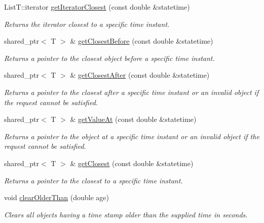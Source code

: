 \begin{DoxyCompactItemize}
List\-T\-::iterator \hyperlink{classmsf__core_1_1SortedContainer_a64ce9fdfdd6220f78187e7270f689f02}{get\-Iterator\-Closest} (const double \&statetime)
\begin{DoxyCompactList}\small\item\em Returns the iterator closest to a specific time instant. \end{DoxyCompactList}\item 
shared\-\_\-ptr$<$ T $>$ \& \hyperlink{classmsf__core_1_1SortedContainer_ad027825ff0a1360acbe6b9c60f708cd9}{get\-Closest\-Before} (const double \&statetime)
\begin{DoxyCompactList}\small\item\em Returns a pointer to the closest object before a specific time instant. \end{DoxyCompactList}\item 
shared\-\_\-ptr$<$ T $>$ \& \hyperlink{classmsf__core_1_1SortedContainer_a1bf7a97e06b2dd5bc2b6588dcb6799b8}{get\-Closest\-After} (const double \&statetime)
\begin{DoxyCompactList}\small\item\em Returns a pointer to the closest after a specific time instant or an invalid object if the request cannot be satisfied. \end{DoxyCompactList}\item 
shared\-\_\-ptr$<$ T $>$ \& \hyperlink{classmsf__core_1_1SortedContainer_aa0de5fa4d79a266a36556b67252a7d34}{get\-Value\-At} (const double \&statetime)
\begin{DoxyCompactList}\small\item\em Returns a pointer to the object at a specific time instant or an invalid object if the request cannot be satisfied. \end{DoxyCompactList}\item 
shared\-\_\-ptr$<$ T $>$ \& \hyperlink{classmsf__core_1_1SortedContainer_ab262e5e5904b047df44110c1d05babdc}{get\-Closest} (const double \&statetime)
\begin{DoxyCompactList}\small\item\em Returns a pointer to the closest to a specific time instant. \end{DoxyCompactList}\item 
void \hyperlink{classmsf__core_1_1SortedContainer_aa2e690d22ea362eeb281ce30a96751d5}{clear\-Older\-Than} (double age)
\begin{DoxyCompactList}\small\item\em Clears all objects having a time stamp older than the supplied time in seconds. \end{DoxyCompactList}\item 

\end{DoxyCompactItemize}
